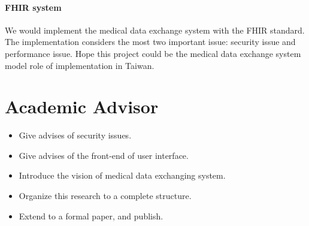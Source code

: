 \documentclass[12pt,a4paper]{IEEEconf}
\begin{document}
\paragraph{FHIR system}
We would implement the medical data exchange system with the FHIR standard. The implementation
considers the most two important issue: security issue and performance issue. Hope this project
could be the medical data exchange system model role of implementation in Taiwan.

\printbibheading[heading=bibnumbered]
\printbibliography\newrefcontext

\section{Academic Advisor}
\begin{itemize}
  \item Give advises of security issues.
  \item Give advises of the front-end of user interface.
  \item Introduce the vision of medical data exchanging system.
  \item Organize this research to a complete structure.
  \item Extend to a formal paper, and publish.
\end{itemize}
\end{document}
